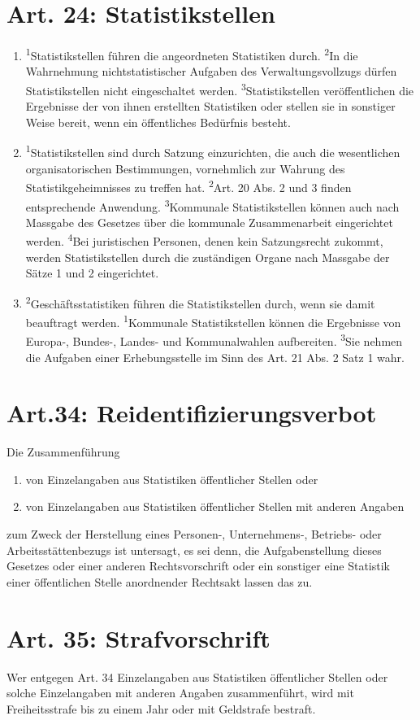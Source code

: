     \section{Art. 24: Statistikstellen}
        \begin{enumerate}[label=(\arabic*)]
            \item \textsuperscript{1}Statistikstellen führen die angeordneten Statistiken durch. \textsuperscript{2}In die Wahrnehmung nichtstatistischer Aufgaben des Verwaltungsvollzugs dürfen Statistikstellen nicht eingeschaltet werden. \textsuperscript{3}Statistikstellen veröffentlichen die Ergebnisse der von ihnen erstellten Statistiken oder stellen sie in sonstiger Weise bereit, wenn ein öffentliches Bedürfnis besteht.
            \item \textsuperscript{1}Statistikstellen sind durch Satzung einzurichten, die auch die wesentlichen organisatorischen Bestimmungen, vornehmlich zur Wahrung des Statistikgeheimnisses zu treffen hat. \textsuperscript{2}Art. 20 Abs. 2 und 3 finden entsprechende Anwendung. \textsuperscript{3}Kommunale Statistikstellen können auch nach Massgabe des Gesetzes über die kommunale Zusammenarbeit eingerichtet werden. \textsuperscript{4}Bei juristischen Personen, denen kein Satzungsrecht zukommt, werden Statistikstellen durch die zuständigen Organe nach Massgabe der Sätze 1 und 2 eingerichtet.
            \item  \textsuperscript{2}Geschäftsstatistiken führen die Statistikstellen durch, wenn sie damit beauftragt werden. \textsuperscript{1}Kommunale Statistikstellen können die Ergebnisse von Europa-, Bundes-, Landes- und Kommunalwahlen aufbereiten. \textsuperscript{3}Sie nehmen die Aufgaben einer Erhebungsstelle im Sinn des Art. 21 Abs. 2 Satz 1 wahr.
        \end{enumerate}
        
    \section{Art.34: Reidentifizierungsverbot}
        Die Zusammenführung
        \begin{enumerate}[label=\arabic*.]
            \item von Einzelangaben aus Statistiken öffentlicher Stellen oder
            \item von Einzelangaben aus Statistiken öffentlicher Stellen mit anderen Angaben
        \end{enumerate}
         zum Zweck der Herstellung eines Personen-, Unternehmens-, Betriebs- oder Ar\-beits\-stät\-ten\-be\-zugs ist untersagt, es sei denn, die Aufgabenstellung dieses Gesetzes oder einer anderen Rechtsvorschrift oder ein sonstiger eine Statistik einer öffentlichen Stelle anordnender Rechtsakt lassen das zu. 
     
    \section{Art. 35: Strafvorschrift}
        Wer entgegen Art. 34 Einzelangaben aus Statistiken öffentlicher Stellen oder solche Einzelangaben mit anderen Angaben zusammenführt, wird mit Freiheitsstrafe bis zu einem Jahr oder mit Geldstrafe bestraft.
